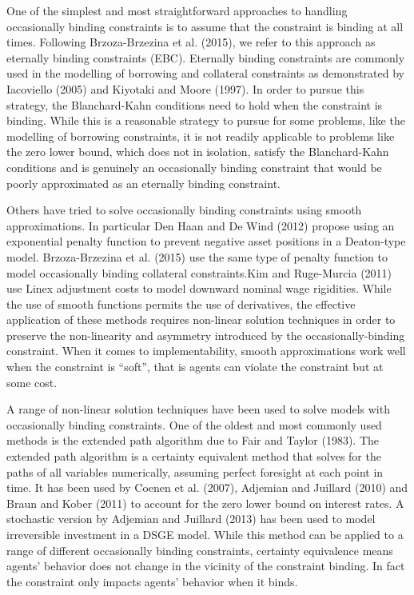 \documentclass[10pt,math=newtx,citestyle=gb7714-2015,bibstyle=gb7714-2015]{elegantbook}
\begin{document}
	One of the simplest and most straightforward approaches to handling occasionally binding constraints is to assume that the constraint is binding at all times. Following Brzoza-Brzezina et al. (2015), we refer to this approach as eternally binding constraints (EBC). Eternally binding constraints are commonly used in the modelling of borrowing and collateral constraints as demonstrated by Iacoviello (2005) and Kiyotaki and Moore (1997). In order to pursue this strategy, the Blanchard-Kahn conditions need to hold when the constraint is binding. While this is a reasonable strategy to pursue for some problems, like the modelling of borrowing constraints, it is not readily applicable to problems like the zero lower bound, which does not in isolation, satisfy the Blanchard-Kahn conditions and is genuinely an occasionally binding constraint that would be poorly approximated as an eternally binding constraint.
	
	Others have tried to solve occasionally binding constraints using smooth approximations. In particular Den Haan and De Wind (2012) propose using an exponential penalty function to prevent negative asset positions in a Deaton-type model. Brzoza-Brzezina et al. (2015) use the same type of penalty function to model occasionally binding collateral constraints.Kim and Ruge-Murcia (2011) use Linex adjustment costs to model downward nominal wage rigidities. While the use of smooth functions permits the use of derivatives, the effective application of these methods requires non-linear solution techniques in order to preserve the non-linearity and asymmetry introduced by the occasionally-binding constraint. When it comes to implementability, smooth approximations work well when the constraint is ``soft'', that is agents can violate the constraint but at some cost.
	
	A range of non-linear solution techniques have been used to solve models with occasionally binding constraints. One of the oldest and most commonly used methods is the extended path algorithm due to Fair and Taylor (1983). The extended path algorithm is a certainty equivalent
	method that solves for the paths of all variables numerically, assuming perfect foresight at each point in time. It has been used by Coenen et al. (2007), Adjemian and Juillard (2010) and Braun and Kober (2011) to account for the zero lower bound on interest rates. A stochastic
	version by Adjemian and Juillard (2013) has been used to model irreversible investment in a DSGE model. While this method can be applied to a range of different occasionally binding constraints, certainty equivalence means agents' behavior does not change in the vicinity of
	the constraint binding. In fact the constraint only impacts agents' behavior when it binds.
	
\end{document}
